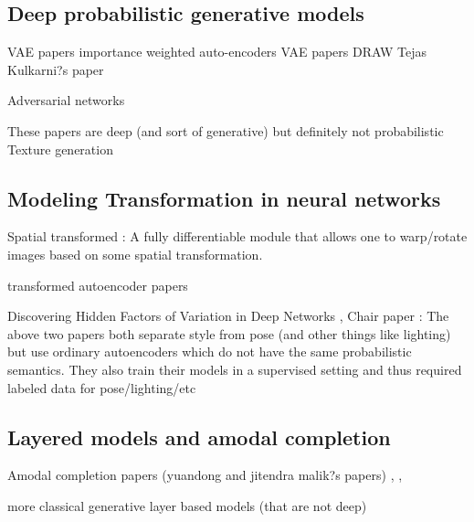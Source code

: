 

\subsection{Deep probabilistic generative models}

VAE papers
		importance weighted auto-encoders \cite{burda2015importance}
		 VAE papers \cite{Kingma2014, kingma2014semi,rezende2014stochastic}
		DRAW \cite{gregor2015draw}
		Tejas Kulkarni?s paper \cite{kulkarni2015deep}
		
		Adversarial networks \cite{denton2015deep, goodfellow2014generative}
		
	These papers are deep (and sort of generative) but definitely not probabilistic
	Texture generation \cite{gatys2015a, gatys2015b}
	

\subsection{Modeling Transformation in neural networks}

	Spatial transformed  \cite{jaderberg2015spatial}: A fully differentiable module that allows one to warp/rotate images based on some spatial transformation.
	
	transformed autoencoder papers \cite{hinton2011transforming}
	
	Discovering Hidden Factors of Variation in Deep Networks \cite{cheung2014discovering},
	Chair paper \cite{dosovitskiy2014learning}: The above two papers both separate style from pose (and other things like lighting) but use ordinary autoencoders which do not have the same probabilistic semantics.  They also train their models in a supervised setting and thus required labeled data for pose/lighting/etc


\subsection{Layered models and amodal completion}


	Amodal completion papers (yuandong and jitendra malik?s papers)
		\cite{amodalKarTCM15}, \cite{categoryShapesKar15}, \cite{zhu2015semantic}
	
	more classical generative layer based models (that are not deep)
	\cite{le2011learning}
	\cite{yang2012layered}
	\cite{kannan2005generative}
